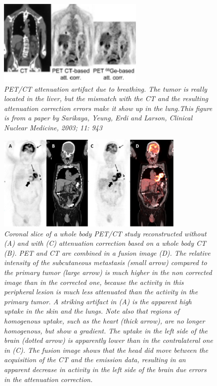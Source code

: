 \documentclass[11pt,oneside]{article}
\begin{document}
%
\begin{figure}[tbp]
\centering
\includegraphics[width=0.63\textwidth]{figs/fig_petctbreathing.pdf}
\caption{\label{fig:petctbreathing} \emph{PET/CT attenuation artifact
due to breathing. The tumor is really located in the liver, but the
mismatch with the CT and the resulting attenuation correction errors
make it show up in the lung.This figure is from a paper by Sarikaya,
Yeung, Erdi and Larson, Clinical Nuclear Medicine, 2003; 11: 943}}
\end{figure}

\begin{figure}[tbp]
\centering
\includegraphics[width=0.81\textwidth]{figs/fig_petctatcor.pdf}
\caption{\label{fig:petctatcor} \emph{Coronal slice of a whole body
PET/CT study reconstructed without (A) and with (C) attenuation
correction based on a whole body CT (B). PET and CT are combined in a
fusion image (D). The relative intensity of the subcutaneous
metastasis (small arrow) compared to the primary tumor (large arrow)
is much higher in the non corrected image than in the corrected one,
because the activity in this peripheral lesion is much less attenuated
than the activity in the primary tumor. A striking artifact in (A) is
the apparent high uptake in the skin and the lungs. Note also that
regions of homogenous uptake, such as the heart (thick arrow), are no
longer homogenous, but show a gradient. The uptake in the left side of
the brain (dotted arrow) is apparently lower than in the contralateral
one in (C). The fusion image shows that the head did move between the
acquisition of the CT and the emission data, resulting in an apparent
decrease in activity in the left side of the brain due errors in the
attenuation correction.}}
\end{figure}
\end{document}
